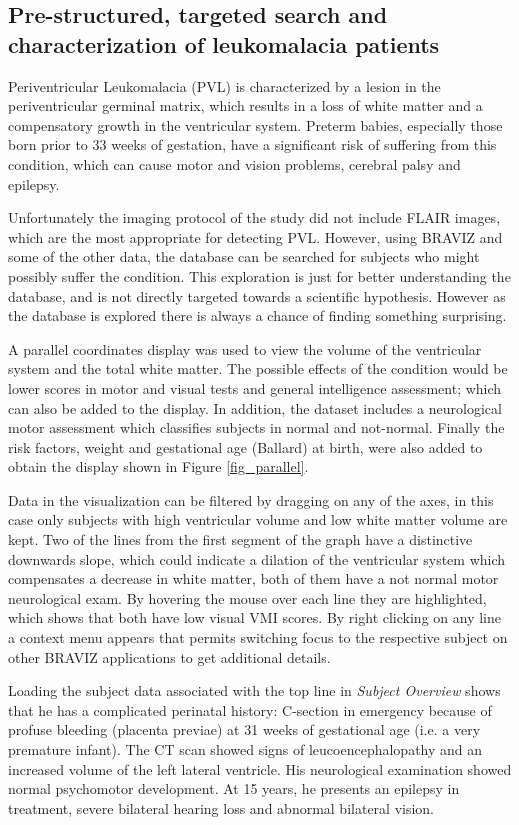 \documentclass{frontiersHLTH}
\begin{document}
  
\subsection{Pre-structured, targeted search and characterization of leukomalacia patients}
\label{sec_pvm_case}
Periventricular Leukomalacia (PVL) is characterized by a lesion in the periventricular germinal matrix, which results in a loss of white matter and a compensatory growth in the ventricular system. Preterm babies, especially those born prior to 33 weeks of gestation, have a significant risk of suffering from this condition, which can cause motor and vision problems, cerebral palsy and epilepsy.    

Unfortunately the imaging protocol of the study did not include FLAIR images, which are the most appropriate for detecting PVL. However, using BRAVIZ and some of the other data, the database can be searched for subjects who might possibly suffer the condition. This exploration is just for better understanding the database, and is not directly targeted towards a scientific hypothesis. However as the database is explored there is always a chance of finding something surprising.

A parallel coordinates display was used to view the volume of the ventricular system and the total white matter. The possible effects of the condition would be lower scores in motor and visual tests and general intelligence assessment; which can also be added to the display. In addition, the dataset includes a neurological motor assessment which classifies subjects in normal and not-normal.  Finally the risk factors, weight and gestational age (Ballard) at birth, were also added to obtain the display shown in Figure \ref{fig_parallel}.

Data in the visualization can be filtered by dragging on any of the axes, in this case only subjects with high ventricular volume and low white matter volume are kept. Two of the lines from the first segment of the graph have a distinctive downwards slope, which could indicate a dilation of the ventricular system which compensates a decrease in white matter, both of them have a not normal motor neurological exam. By hovering the mouse over each line they are highlighted, which shows that both have low visual VMI scores. By right clicking on any line a context menu appears that permits switching focus to the respective subject on other BRAVIZ applications to get additional details. 

Loading the subject data associated with the top line in \emph{Subject Overview} shows that he has a complicated perinatal history: C-section in emergency because of profuse bleeding (placenta previae) at 31 weeks of gestational age (i.e. a very premature infant). The  CT scan showed signs of leucoencephalopathy  and an  increased volume of the left lateral ventricle. His neurological examination showed normal psychomotor development. At 15 years, he presents an epilepsy in  treatment, severe bilateral hearing loss and abnormal bilateral vision.  
\end{document}
